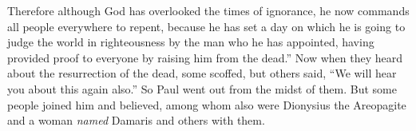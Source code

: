 \begin{biblechapter}
\verse Therefore although God has overlooked the times of ignorance, he now commands all people everywhere to repent,
\verse because he has set a day on which he is going to judge the world in righteousness by the man who he has appointed, having provided proof to everyone by raising him from the dead.”
\verse Now when they heard about the resurrection of the dead, some scoffed, but others said, “We will hear you about this again also.”
\verse So Paul went out from the midst of them.
\verse But some people joined him and believed, among whom also were Dionysius the Areopagite and a woman \textit{named} Damaris and others with them.
\end{biblechapter}

